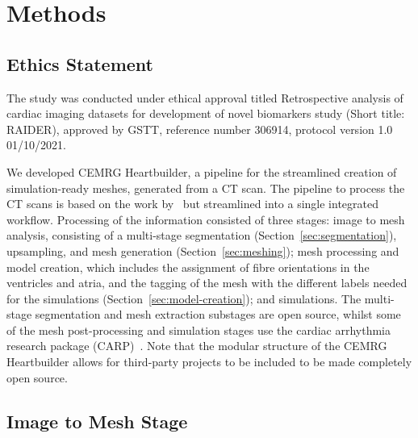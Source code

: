 \section{Methods}

\subsection*{Ethics Statement}
The study was conducted under ethical approval titled
Retrospective analysis of cardiac imaging datasets for development of novel biomarkers study
(Short title: RAIDER),
approved by GSTT,
reference number 306914,
protocol version 1.0 01/10/2021.

We developed CEMRG Heartbuilder, a pipeline for the streamlined creation of simulation-ready meshes, 
generated from a CT scan. 
The pipeline to process the CT scans is based on the work by~\cite{strocchi2020_cohort} 
but streamlined into a single integrated workflow.
Processing of the information consisted of three stages: 
image to mesh analysis, consisting of a multi-stage segmentation (Section~\ref{sec:segmentation}), 
upsampling, and mesh generation (Section~\ref{sec:meshing}); 
mesh processing and model creation, which includes the assignment of fibre orientations
in the ventricles and atria, 
and the tagging of the mesh with the different labels needed for the simulations (Section~\ref{sec:model-creation}); 
and simulations. 
The multi-stage segmentation and mesh extraction substages are open source, 
whilst some of the mesh post-processing and simulation stages use the 
cardiac arrhythmia research package (CARP)~\cite{carp-2003}. 
Note that the modular structure of the CEMRG Heartbuilder allows for third-party projects to be 
included to be made completely open source.

\subsection{Image to Mesh Stage}
